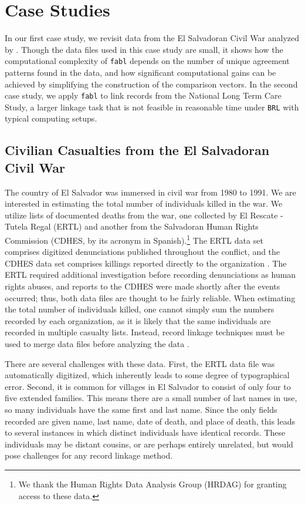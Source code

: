\documentclass[ba]{imsart}
\begin{document}
	\section{Case Studies}
	\label{sec:case-studies}
	
	In our first case study, we revisit data from the El Salvadoran Civil War analyzed by \cite{sadinle_bayesian_2017}. Though the data files used in this case study are small, it shows how the computational complexity of \texttt{fabl} depends on the number of unique agreement patterns found in the data, and how significant computational gains can be achieved by simplifying the construction of the comparison vectors. In the second case study, we apply \texttt{fabl} to link records from the National Long Term Care Study, a larger linkage task that is not feasible in reasonable time under \texttt{BRL} with typical computing setups. 
	
	\subsection{Civilian Casualties from the El Salvadoran Civil War}
	\label{el_salvador}
	
	The country of El Salvador was immersed in civil war from 1980 to 1991. We are interested in estimating the total number of individuals killed in the war. We utilize lists of documented deaths from the war, one collected by El Rescate - Tutela Regal (ERTL) and another from the Salvadoran Human Rights Commission (CDHES, by its acronym in Spanish).\footnote{We thank the Human Rights Data Analysis Group (HRDAG) for granting access to these data.} The ERTL data set comprises digitized denunciations published throughout the conflict, and the CDHES data set comprises killings reported directly to the organization \citep{howland2008rescate, ball2000salvadoran, green2019civilian}. The ERTL required additional investigation before recording denunciations as human rights abuses, and reports to the CDHES were made shortly after the events occurred; thus, both data files are thought to be fairly reliable. When estimating the total number of individuals killed, one cannot simply sum the numbers recorded by each organization, as it is likely that the same individuals are recorded in multiple casualty lists. Instead, record linkage techniques must be used to merge data files before analyzing the data \citep{lum2013applications}. 
	
There are several challenges with these data. First, the ERTL data file was automatically digitized, which inherently leads to some degree of typographical error. Second, it is common for villages in El Salvador to consist of only four to five extended families. This means there are a small number of last names in use, so many individuals have the same first and last name. Since the only fields recorded are given name, last name, date of death, and place of death, this leads to several instances in which distinct individuals have identical records. These individuals may be distant cousins, or are perhaps entirely unrelated, but would pose challenges for any record linkage method.
	
\end{document}
